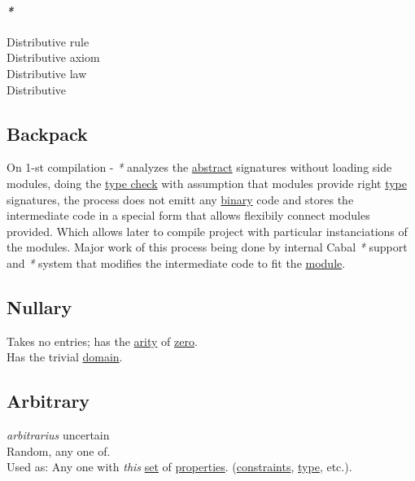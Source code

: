 \documentclass[11pt]{article}
\begin{document}
\paragraph{\emph{*}}
\label{sec:orgd38aa70}

\label{org9523833}Distributive rule\\
\label{orgd0c54c3}Distributive axiom\\
\label{orgba95831}Distributive law\\
\label{org49b5544}Distributive\\

\subsection{\label{org0b05fa5}Backpack}
\label{sec:org56fee03}
On 1-st compilation - \emph{*} analyzes the \hyperref[org606d002]{abstract} signatures without loading side modules, doing the \hyperref[org4fdea01]{type check} with assumption that modules provide right \hyperref[org4fbaeb8]{type} signatures, the process does not emitt any \hyperref[orgee106ab]{binary} code and stores the intermediate code in a special form that allows flexibily connect modules provided. Which allows later to compile project with particular instanciations of the modules. Major work of this process being done by internal Cabal \emph{*} support and \emph{*} system that modifies the intermediate code to fit the \hyperref[orgde475c6]{module}.\\

\subsection{\label{org0fa472a}Nullary}
\label{sec:org4036acd}
Takes no entries; has the \hyperref[orgcb1a08f]{arity} of \hyperref[orgf8da8e8]{zero}.\\
Has the trivial \hyperref[orgf784585]{domain}.\\

\subsection{\label{orgbfdf9b7}Arbitrary}
\label{sec:org03238e7}
\emph{arbitrarius} uncertain\\

Random, any one of.\\

Used as: Any one with \emph{this} \hyperref[orgbed80ba]{set} of \hyperref[org763ad6b]{properties}. (\hyperref[org76311a9]{constraints}, \hyperref[org4fbaeb8]{type}, etc.).\\
\end{document}
